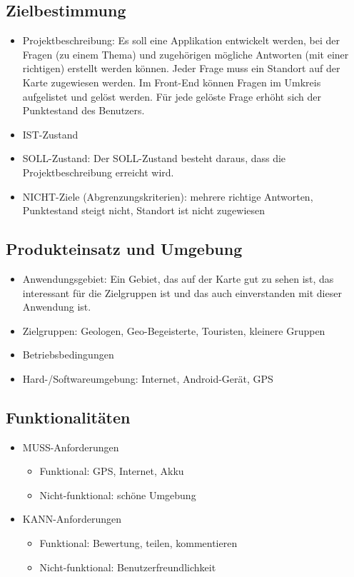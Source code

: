 \subsection{Zielbestimmung}
\begin{itemize}
	\item Projektbeschreibung:
	Es soll eine Applikation entwickelt werden, bei der Fragen (zu einem Thema) und zugehörigen mögliche Antworten (mit einer richtigen) erstellt werden können. Jeder Frage muss ein Standort auf der Karte zugewiesen werden. 
	Im Front-End können Fragen im Umkreis aufgelistet und gelöst werden. Für jede gelöste Frage erhöht sich der Punktestand des Benutzers.  
	
	\item IST-Zustand
	
	
	\item SOLL-Zustand:
	Der SOLL-Zustand besteht daraus, dass die Projektbeschreibung erreicht wird. 
	\item NICHT-Ziele (Abgrenzungskriterien):
	mehrere richtige Antworten,
	Punktestand steigt nicht,
	Standort ist nicht zugewiesen
\end{itemize}
\subsection{Produkteinsatz und Umgebung}
\begin{itemize}
	\item Anwendungsgebiet:
	Ein Gebiet, das auf der Karte gut zu sehen ist, das interessant für die Zielgruppen ist und das auch einverstanden mit dieser Anwendung ist. 
	\item Zielgruppen:
	Geologen, Geo-Begeisterte, Touristen, kleinere Gruppen
	\item Betriebsbedingungen
	\item Hard-/Softwareumgebung:
	Internet, Android-Gerät, GPS
\end{itemize}
\subsection{Funktionalitäten}
\begin{itemize}
	\item MUSS-Anforderungen
	\begin{itemize}
		\item Funktional:
		GPS, Internet, Akku
		\item Nicht-funktional:
		schöne Umgebung
	\end{itemize}
	\item KANN-Anforderungen
	\begin{itemize}
		\item Funktional: 
		Bewertung, teilen, kommentieren
		\item Nicht-funktional:
		Benutzerfreundlichkeit
	\end{itemize}
\end{itemize}
